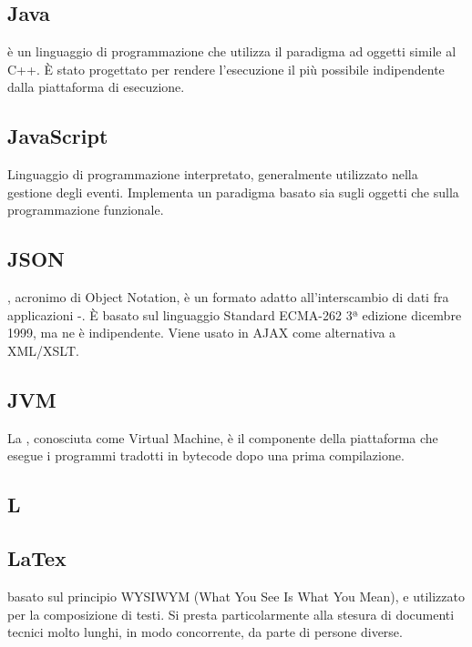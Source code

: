 \subsection{Java}
 è un linguaggio di programmazione che utilizza il paradigma ad oggetti simile al C++. È stato
progettato per rendere l'esecuzione il più possibile indipendente dalla piattaforma di
esecuzione.

\subsection{JavaScript}
Linguaggio di programmazione interpretato, generalmente utilizzato nella gestione
degli eventi. Implementa un paradigma basato sia sugli oggetti che sulla programmazione
funzionale.

\subsection{JSON}
, acronimo di  Object Notation, è un formato adatto all'interscambio di dati fra applicazioni -. È basato sul linguaggio  Standard ECMA-262 3ª edizione dicembre 1999, ma ne è indipendente. Viene usato in AJAX come alternativa a XML/XSLT.

\subsection{JVM}
La , conosciuta come  Virtual Machine, è il componente della piattaforma  che esegue i programmi tradotti in bytecode dopo una prima compilazione.

\newpage

\begin{center}
\Huge\section{\uppercase{L}}
\end{center}

\subsection{LaTex}
 basato sul principio WYSIWYM (What You See Is What You
Mean), e utilizzato per la composizione di testi. Si presta particolarmente alla stesura di
documenti tecnici molto lunghi, in modo concorrente, da parte di persone diverse.

